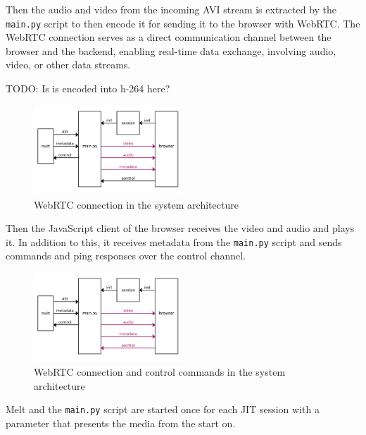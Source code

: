 \documentclass[12pt,a4paper]{article}
\begin{document}
Then the audio and video from the incoming AVI stream is extracted by the \texttt{main.py} script to then encode it for sending it to the browser with WebRTC. The WebRTC connection serves as a direct communication channel between the browser and the backend, enabling real-time data exchange, involving audio, video, or other data streams. 

TODO: Is is encoded into h-264 here?

%

\begin{figure}[H]
	\centering
	\includegraphics[width=0.5\textwidth]{IM_wrtc.png}
	\caption{WebRTC connection in the system architecture}
\end{figure}

Then the JavaScript client of the browser receives the video and audio and plays it. In addition to this, it
receives metadata from the \texttt{main.py} script and sends commands and ping responses over the control channel.


\begin{figure}[H]
	\centering
	\includegraphics[width=0.5\textwidth]{IM_wrtc_control.png}
	\caption[WebRTC and control in the system architecture]{WebRTC connection and control commands in the system architecture}
\end{figure}

Melt and the \texttt{main.py} script are started once for each JIT session with a parameter that presents the media from the start on.
\end{document}
